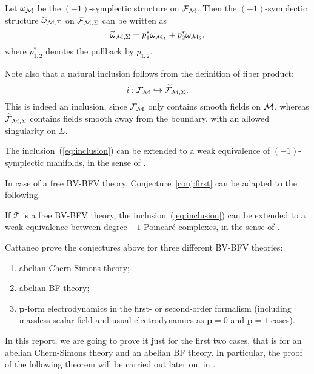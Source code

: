 Let $\omega_{\mathcal{M}}$ be the $(-1)$-symplectic structure on $\mathcal{F}_{\mathcal{M}}$. Then the $(-1)$-symplectic structure $\widetilde{\omega}_{\mathcal{M},\Sigma}$ on $\mathcal{F}_{\mathcal{M},\Sigma}$ can be written as
\begin{equation}
\label{eq:wt_omega}
    \widetilde{\omega}_{\mathcal{M},\Sigma} = 
    p_1^* \omega_{\mathcal{M}_1} + p_2^* \omega_{\mathcal{M}_2} ,
\end{equation}
where $p_{1,2}^*$ denotes the pullback by $p_{1,2}$.

Note also that a natural inclusion follows from the definition of fiber product:
\begin{equation}
\label{eq:inclusion}
    i : \mathcal{F}_{\mathcal{M}} \hookrightarrow \widetilde{\mathcal{F}}_{\mathcal{M},\Sigma} .
\end{equation}
This is indeed an inclusion, since $\mathcal{F}_{\mathcal{M}}$ only contains smooth fields on $\mathcal{M}$, whereas $\widetilde{\mathcal{F}}_{\mathcal{M}, \Sigma}$ contains fields smooth away from the boundary, with an allowed singularity on $\Sigma$.

\begin{conj}
\label{conj:first}
    The inclusion~(\ref{eq:inclusion}) can be extended to a weak equivalence of $(-1)$-symplectic manifolds, in the sense of .
\end{conj}

In case of a free BV-BFV theory, Conjecture~\ref{conj:first} can be adapted to the following.

\begin{conj}
\label{conj:second}
    If $\mathcal{T}$ is a free BV-BFV theory, the inclusion~(\ref{eq:inclusion}) can be extended to a weak equivalence between degree $-1$ Poincaré complexes, in the sense of .
\end{conj}

Cattaneo \etal \cite{Gluing_BV-BFV} prove the conjectures above for three different BV-BFV theories:
\begin{enumerate}[label={\arabic*)}]
    \item abelian Chern-Simons theory;
    \item abelian BF theory;
    \item $\mathbf{p}$-form electrodynamics in the first- or second-order formalism (including massless scalar field and usual electrodynamics as $\mathbf{p} = 0$ and $\mathbf{p} = 1$ cases).
\end{enumerate}

In this report, we are going to prove it just for the first two cases, that is for an abelian Chern-Simons theory and an abelian BF theory.
In particular, the proof of the following theorem will be carried out later on, in .

